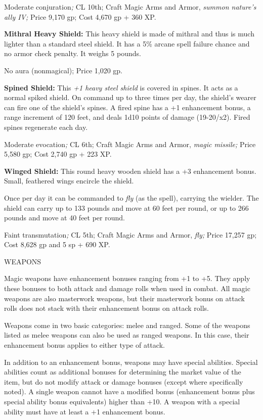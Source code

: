 \documentclass{article}
\begin{document}
Moderate conjuration\textit{; }CL 10th; Craft Magic Arms and Armor, \textit{summon 
nature's ally IV; }Price 9,170 gp; Cost 4,670 gp + 360 XP.

\textbf{Mithral Heavy Shield:} This heavy shield is made of mithral and thus is 
much lighter than a standard steel shield. It has a 5\% arcane spell failure chance 
and no armor check penalty. It weighs 5 pounds.

No aura (nonmagical); Price 1,020 gp.

\textbf{Spined Shield: }This \textit{+1 heavy steel shield }is covered in spines. 
It acts as a normal spiked shield. On command up to three times per day, the shield's 
wearer can fire one of the shield's spines. A fired spine has a +1 enhancement 
bonus, a range increment of 120 feet, and deals 1d10 points of damage (19-20/x2). 
Fired spines regenerate each day.

Moderate evocation\textit{; }CL 6th; Craft Magic Arms and Armor, \textit{magic 
missile; }Price 5,580 gp; Cost 2,740 gp + 223 XP.

\textbf{Winged Shield:} This round heavy wooden shield has a +3 enhancement bonus. 
Small, feathered wings encircle the shield.

Once per day it can be commanded to \textit{fly }(as the spell), carrying the wielder. 
The shield can carry up to 133 pounds and move at 60 feet per round, or up to 266 
pounds and move at 40 feet per round.

Faint transmutation\textit{; }CL 5th; Craft Magic Arms and Armor, \textit{fly; 
}Price 17,257 gp; Cost 8,628 gp and 5 sp + 690 XP.

\vspace{12pt}
WEAPONS

Magic weapons have enhancement bonuses ranging from +1 to +5. They apply these 
bonuses to both attack and damage rolls when used in combat. All magic weapons 
are also masterwork weapons, but their masterwork bonus on attack rolls does not 
stack with their enhancement bonus on attack rolls.

Weapons come in two basic categories: melee and ranged. Some of the weapons listed 
as melee weapons can also be used as ranged weapons. In this case, their enhancement 
bonus applies to either type of attack.

In addition to an enhancement bonus, weapons may have special abilities. Special 
abilities count as additional bonuses for determining the market value of the item, 
but do not modify attack or damage bonuses (except where specifically noted). A 
single weapon cannot have a modified bonus (enhancement bonus plus special ability 
bonus equivalents) higher than +10. A weapon with a special ability must have at 
least a +1 enhancement bonus.
\end{document}
